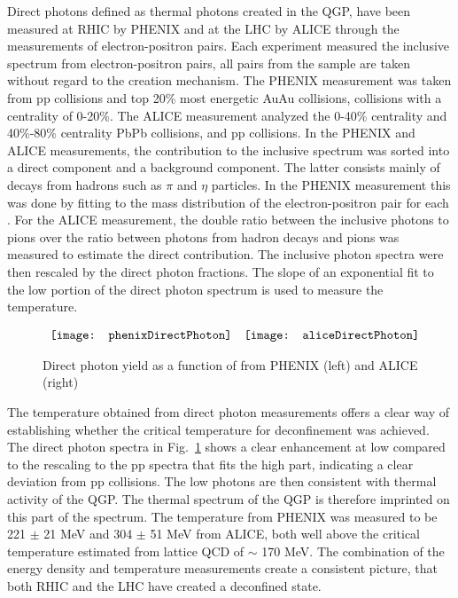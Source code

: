     Direct photons defined as thermal photons created in the QGP, have been 
      measured at RHIC by PHENIX \cite{phenixPhoton2010} and at the LHC by ALICE 
      \cite{photonALICE} through the measurements of electron-positron pairs.
    Each experiment measured the inclusive \pt{} spectrum from 
      electron-positron pairs, all pairs from the sample are taken without
      regard to the creation mechanism.
    The PHENIX measurement was taken from pp collisions and top 20\% most 
      energetic AuAu collisions, collisions with a centrality of 0-20\%. 
    The ALICE measurement analyzed the 0-40\% centrality and 40\%-80\% centrality
      PbPb collisions, and pp collisions. 
    In the PHENIX and ALICE measurements, the contribution to the inclusive 
      spectrum was sorted into a direct component and a background component.
    The latter consists mainly of decays from hadrons such as $\pi$ and $\eta$
      particles. 
    In the PHENIX measurement this was done by fitting to the mass 
      distribution of the electron-positron pair for each \pt{}.
    For the ALICE measurement, the double ratio between the inclusive photons 
      to pions over the ratio between photons from hadron decays and pions was
      measured to estimate the direct contribution. 
    The inclusive photon \pt{} spectra were then rescaled by the direct 
      photon fractions.
    The slope of an exponential fit to the low \pt{} portion of the direct 
      photon spectrum is used to measure the temperature.
    \begin{figure}[!Hhbt]
      \centering
      $ \begin{array}{c c}
        \texttt{[image: phenixDirectPhoton]} &
        \texttt{[image: aliceDirectPhoton]}
      \end{array} $
      \caption{Direct photon yield as a function of \pt{} from 
        PHENIX \cite{phenixPhoton2010} (left) and ALICE \cite{photonALICE} 
        (right)}
      \label{fig:directPhotonPt}
    \end{figure}

    The temperature obtained from direct photon measurements offers a clear
      way of establishing whether the critical temperature for deconfinement
      was achieved. 
    The direct photon \pt{} spectra in Fig.~\ref{fig:directPhotonPt} shows a 
      clear enhancement at low \pt{} compared to the rescaling to the pp 
      spectra that fits the high \pt{} part, indicating a clear deviation from 
      pp collisions.
    The low \pt{} photons are then consistent with thermal activity of
      the QGP.
    The thermal spectrum of the QGP is therefore imprinted on this part of 
      the spectrum.
    The temperature from PHENIX was measured to be 221 $\pm$ 21 MeV and 
      304 $\pm$ 51 MeV from ALICE, both well above the critical temperature
      estimated from lattice QCD of $\sim$ 170 MeV.
    The combination of the energy density and temperature measurements
      create a consistent picture, that both RHIC and the LHC have created a 
      deconfined state.

